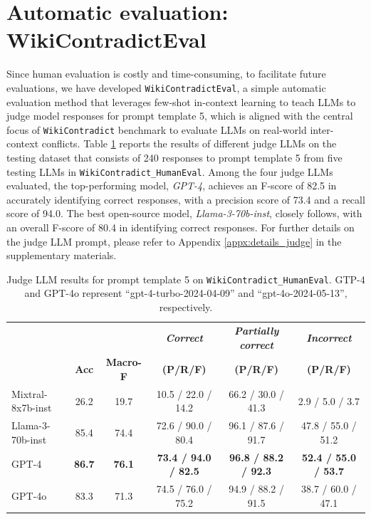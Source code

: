 \section{Automatic evaluation: WikiContradictEval}
\label{sec:auto_eval}

Since human evaluation is costly and time-consuming, to facilitate future evaluations, we have developed \texttt{WikiContradictEval}, a simple automatic evaluation method that leverages few-shot in-context learning to teach LLMs to judge model responses for prompt template 5, which is aligned with the central focus of \texttt{WikiContradict} benchmark to evaluate LLMs on real-world inter-context conflicts. Table \ref{tab:auto_eval_llmjudge} reports the results of different judge LLMs on the testing dataset that consists of 240 responses to prompt template 5 from five testing LLMs in \texttt{WikiContradict\_HumanEval}. Among the four judge LLMs evaluated, the top-performing model, \emph{GPT-4}, achieves an F-score of 82.5 in accurately identifying correct responses, with a precision score of 73.4 and a recall score of 94.0. The best open-source model, \emph{Llama-3-70b-inst}, closely follows, with an overall F-score of 80.4 in identifying correct responses. For further details on the judge LLM prompt, please refer to Appendix \ref{appx:details_judge} in the supplementary materials.


  

\begin{table}[t]
    \centering
    \caption{Judge LLM results for prompt template 5 on \texttt{WikiContradict\_HumanEval}. GTP-4 and GPT-4o represent ``gpt-4-turbo-2024-04-09'' and ``gpt-4o-2024-05-13'', respectively.}
    \label{tab:auto_eval_llmjudge}
    \begin{small}
    \begin{tabular}{|l|c|c|c|c|c|}
    \hline

        ~ &  &  & \emph{\textbf{Correct}}  &\emph{\textbf{Partially correct}}  & \emph{\textbf{Incorrect}}   \\ 
        ~ & \textbf{Acc} & \textbf{Macro-F} & \textbf{(P/R/F)} & \textbf{(P/R/F)} &  \textbf{(P/R/F)}  \\ \hline    
  Mixtral-8x7b-inst & 26.2 & 19.7 &  10.5 / 22.0 / 14.2  &  66.2 / 30.0 / 41.3  &  2.9 / 5.0 / 3.7 \\ \hline
        Llama-3-70b-inst & 85.4 & 74.4 &  72.6 / 90.0 / 80.4  &  96.1 / 87.6 / 91.7  &  47.8 / 55.0 / 51.2 \\ \hline
        GPT-4 & \textbf{86.7} & \textbf{76.1} &  \textbf{73.4 / 94.0 / 82.5}  &  \textbf{96.8 / 88.2 / 92.3}  &  \textbf{52.4 / 55.0 / 53.7} \\ \hline
        GPT-4o& 83.3 & 71.3 &  74.5 / 76.0 / 75.2  &  94.9 / 88.2 / 91.5  &  38.7 / 60.0 / 47.1 \\ \hline
    \end{tabular}
    \end{small}
\end{table}


